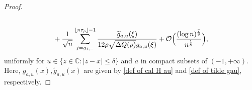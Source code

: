 \documentclass[reqno]{amsart}
\newcommand{\1}{\mathds{1}}
\newcommand{\C}{\mathds{C}}
\numberwithin{equation}{section}
\theoremstyle{definition}
\begin{document}
\begin{proof}
\begin{align}
\begin{split}
\\
&\quad
+\frac{1}{\sqrt{n}} \sum_{j=g_{1,-}}^{\lfloor n\tau_{\rho}\rfloor -1}\frac{\widetilde{g}_{a,u}(\xi)}{12\rho\sqrt{\Delta Q(\rho)}g_{a,u}(\xi)}
+\mathcal{O}\Bigl(\frac{(\log n)^{\frac{7}{8}}}{n^{\frac{1}{8}}}\Bigr),
\end{split}
\end{align}
uniformly for $u\in\{z\in\C:|z-x|\leq \delta\}$ and $a$ in compact subsets of $(-1,+\infty)$.
Here, $g_{a,u}(x),\widetilde{g}_{a,u}(x)$ are given by \eqref{def of cal H au} and \eqref{def of tilde gau}, respectively. 

\end{proof}
\end{document}
